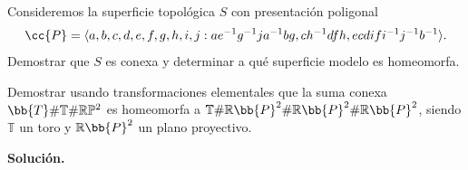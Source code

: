 \documentclass[12pt]{article}
\begin{document}
    \begin{ejercicio}[1.5 puntos]
        Consideremos la superficie topológica $S$ con presentación poligonal
        \begin{equation*}
            \cc{P} = \langle a,b,c,d,e,f,g,h,i,j:ae^{-1}g^{-1}ja^{-1}bg,ch^{-1}dfh,ecdifi^{-1}j^{-1}b^{-1} \rangle .
        \end{equation*}
        Demostrar que $S$ es conexa y determinar a qué superficie modelo es homeomorfa.
    \end{ejercicio}
        
    \begin{ejercicio}
        Demostrar usando transformaciones elementales que la suma conexa $\bb{T}\# \mathbb{T} \# \mathbb{R}\mathbb{P}^2$ es homeomorfa a $\mathbb{T}\# \mathbb{R}\bb{P}^2\# \mathbb{R}\bb{P}^2\# \mathbb{R}\bb{P}^2$, siendo $\mathbb{T}$ un toro y $\mathbb{R}\bb{P}^2$ un plano proyectivo.
    \end{ejercicio}

    \newpage
    \setcounter{ejercicio}{0} %
    \noindent
    \textbf{Solución.}
\end{document}
